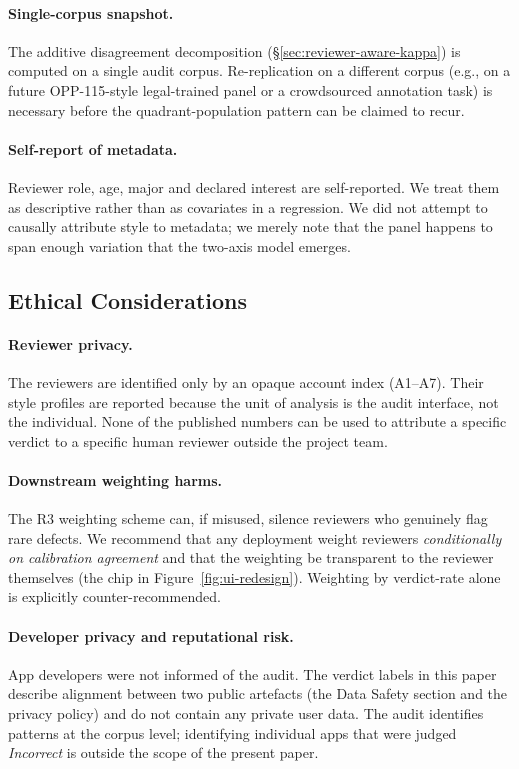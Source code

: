 \documentclass[11pt,a4paper]{article}
\newcommand{\Acc}[1]{\textsf{A#1}}
\begin{document}
\paragraph{Single-corpus snapshot.}
The additive disagreement decomposition
(\S\ref{sec:reviewer-aware-kappa}) is computed on a single audit
corpus. Re-replication on a different corpus (e.g., on a future
OPP-115-style legal-trained panel or a crowdsourced annotation
task) is necessary before the quadrant-population pattern can be
claimed to recur.

\paragraph{Self-report of metadata.}
Reviewer role, age, major and declared interest are self-reported.
We treat them as descriptive rather than as covariates in a
regression. We did not attempt to causally attribute style to
metadata; we merely note that the panel happens to span enough
variation that the two-axis model emerges.

\subsection{Ethical Considerations}
\label{sec:ethics}

\paragraph{Reviewer privacy.}
The reviewers are identified only by an opaque account index
(\Acc{1}--\Acc{7}). Their style profiles are reported because
the unit of analysis is the audit interface, not the individual.
None of the published numbers can be used to attribute a specific
verdict to a specific human reviewer outside the project team.

\paragraph{Downstream weighting harms.}
The R3 weighting scheme can, if misused, silence reviewers who
genuinely flag rare defects. We recommend that any deployment
weight reviewers \emph{conditionally on calibration agreement} and
that the weighting be transparent to the reviewer themselves
(the chip in Figure~\ref{fig:ui-redesign}). Weighting by
verdict-rate alone is explicitly counter-recommended.

\paragraph{Developer privacy and reputational risk.}
App developers were not informed of the audit. The verdict
labels in this paper describe alignment between two public
artefacts (the Data Safety section and the privacy policy) and
do not contain any private user data. The audit identifies
patterns at the corpus level; identifying individual apps that
were judged \emph{Incorrect} is outside the scope of the present
paper.
\end{document}
